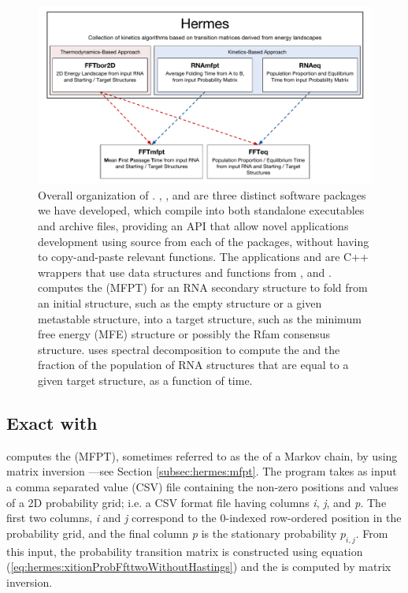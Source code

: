 \begin{figure}[!ht]
\centering
\includegraphics[width=.9\textwidth]{Figures/Hermes/softwareOrg.pdf}
\caption{Overall organization of
\hermes. \ffttwo, \rnamfpt, and \rnaeq are three distinct software
packages we have developed, which compile into both standalone
executables and archive files, providing an API that allow novel
applications development using source from each of the packages,
without having to copy-and-paste relevant functions. The applications
\fftmfpt and \ffteq are C++ wrappers that use data structures and functions from
\ffttwo, \rnamfpt and \rnaeq. \fftmfpt computes the
\mfpt (MFPT) for an RNA secondary structure to fold from an
initial structure, such as the empty structure or a given metastable
structure, into a target structure, such as the minimum free energy
(MFE) structure or possibly the Rfam \citep{Gardner.nar11} consensus
structure. \ffteq uses spectral decomposition to compute the \eqt and the
fraction of the population of RNA structures that are
equal to a given target structure, as a function of time.
}
\label{fig:hermes:organizationHermes}
\end{figure}

\subsection{Exact \mfpt with \rnamfpt}
\label{subsec:hermes:rnamfpt}

\rnamfpt computes the \mfpt (MFPT), sometimes
referred to as the \hit of a Markov chain, by using
matrix inversion \citep{meyermfpt}---see
Section \ref{subsec:hermes:mfpt}. The program takes as input a
comma separated value (CSV) file containing the non-zero positions and
values of a 2D probability grid; i.e. a CSV format file having columns {\em i},
{\em j}, and {\em p}. The first two columns, {\em i} and {\em j}
correspond to the 0-indexed row-ordered position in the probability grid, and
the final column {\em p} is the stationary probability $p_{i,j}$.
From this input, the probability transition matrix is constructed using
equation (\ref{eq:hermes:xitionProbFfttwoWithoutHastings}) and the
\mfpt is computed by matrix inversion.

